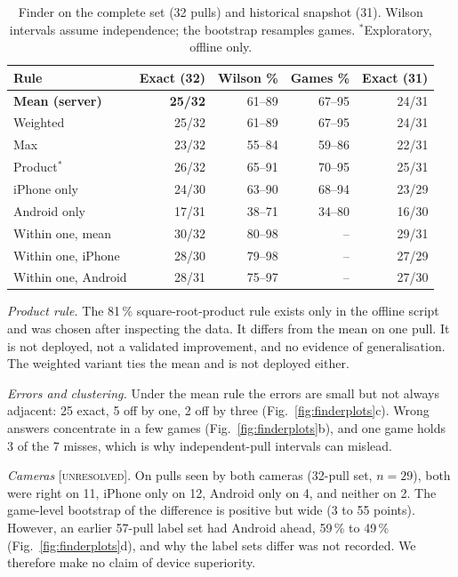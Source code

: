 \documentclass[conference,10pt]{IEEEtran}
\newcommand{\evU}{\textsc{[unresolved]}}
\begin{document}
\begin{table}[!t]
\caption{Finder on the complete set (32 pulls) and historical snapshot (31). Wilson intervals assume independence; the bootstrap resamples games. $^\ast$Exploratory, offline only.}\label{tab:finder}
\centering\footnotesize
\begin{tabular}{@{}lrrrr@{}}
\toprule
Rule & Exact (32) & Wilson \% & Games \% & Exact (31) \\
\midrule
\textbf{Mean (server)} & \textbf{25/32} & 61--89 & 67--95 & 24/31 \\
Weighted & 25/32 & 61--89 & 67--95 & 24/31 \\
Max & 23/32 & 55--84 & 59--86 & 22/31 \\
Product$^\ast$ & 26/32 & 65--91 & 70--95 & 25/31 \\
iPhone only & 24/30 & 63--90 & 68--94 & 23/29 \\
Android only & 17/31 & 38--71 & 34--80 & 16/30 \\
\midrule
Within one, mean & 30/32 & 80--98 & -- & 29/31 \\
Within one, iPhone & 28/30 & 79--98 & -- & 27/29 \\
Within one, Android & 28/31 & 75--97 & -- & 27/30 \\
\bottomrule
\end{tabular}
\end{table}

\emph{Product rule.} The 81\,\% square-root-product rule exists only in the offline script and was chosen after inspecting the data. It differs from the mean on one pull. It is not deployed, not a validated improvement, and no evidence of generalisation. The weighted variant ties the mean and is not deployed either.

\emph{Errors and clustering.} Under the mean rule the errors are small but not always adjacent: 25 exact, 5 off by one, 2 off by three (Fig.~\ref{fig:finderplots}c). Wrong answers concentrate in a few games (Fig.~\ref{fig:finderplots}b), and one game holds 3 of the 7 misses, which is why independent-pull intervals can mislead.

\emph{Cameras} \evU. On pulls seen by both cameras (32-pull set, $n=29$), both were right on 11, iPhone only on 12, Android only on 4, and neither on 2. The game-level bootstrap of the difference is positive but wide (3 to 55 points). However, an earlier 57-pull label set had Android ahead, 59\,\% to 49\,\% (Fig.~\ref{fig:finderplots}d), and why the label sets differ was not recorded. We therefore make no claim of device superiority.
\end{document}
